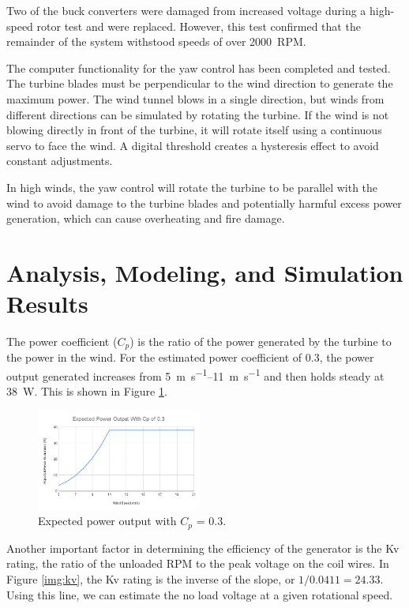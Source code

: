 \documentclass[11pt,letterpaper,conference]{IEEEtran}
\begin{document}
Two of the buck converters were damaged from increased voltage during a
high-speed rotor test and were replaced. However, this test confirmed that the
remainder of the system withstood speeds of over \qty{2000}{RPM}.

The computer functionality for the yaw control has been completed and tested.
The turbine blades must be perpendicular to the wind direction to generate the
maximum power. The wind tunnel blows in a single direction, but winds from
different directions can be simulated by rotating the turbine. If the wind is
not blowing directly in front of the turbine, it will rotate itself using a
continuous servo to face the wind. A digital threshold creates a hysteresis
effect to avoid constant adjustments.

In high winds, the yaw control will rotate the turbine to be parallel with the
wind to avoid damage to the turbine blades and potentially harmful excess power
generation, which can cause overheating and fire damage.

\section{Analysis, Modeling, and Simulation Results}

The power coefficient ($C_p$) is the ratio of the power generated by the
turbine to the power in the wind. For the estimated power coefficient of
\num{0.3}, the power output generated increases from
\qtyrange{5}{11}{\m\per\s} and then holds steady at \qty{38}{\W}. This is
shown in Figure \ref{img:cp}.

\begin{figure}[th]
    \centering
    \includegraphics[width=0.48\textwidth]{images/cp_out.png}
    \caption{Expected power output with $C_p$ = \num{0.3}.}
    \label{img:cp}
\end{figure}

Another important factor in determining the efficiency of the generator is the
Kv rating, the ratio of the unloaded \unit{RPM} to the peak voltage on the coil
wires. In Figure \ref{img:kv}, the Kv rating is the inverse of the slope, or
$1/0.0411 = 24.33$. Using this line, we can estimate the no load voltage at a
given rotational speed.
\end{document}
